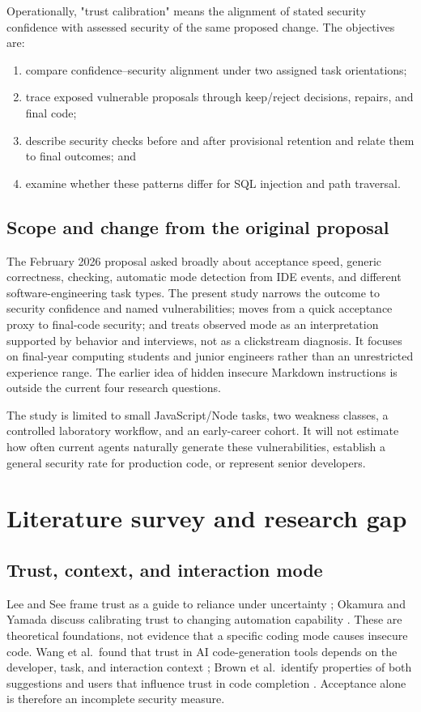 \documentclass[12pt,a4paper]{article}
\begin{document}
Operationally, "trust calibration" means the alignment of stated security confidence with assessed security of the same proposed change. The objectives are:
\begin{enumerate}
  \item compare confidence--security alignment under two assigned task orientations;
  \item trace exposed vulnerable proposals through keep/reject decisions, repairs, and final code;
  \item describe security checks before and after provisional retention and relate them to final outcomes; and
  \item examine whether these patterns differ for SQL injection and path traversal.
\end{enumerate}

\subsection{Scope and change from the original proposal}
The February 2026 proposal asked broadly about acceptance speed, generic correctness, checking, automatic mode detection from IDE events, and different software-engineering task types. The present study narrows the outcome to security confidence and named vulnerabilities; moves from a quick acceptance proxy to final-code security; and treats observed mode as an interpretation supported by behavior and interviews, not as a clickstream diagnosis. It focuses on final-year computing students and junior engineers rather than an unrestricted experience range. The earlier idea of hidden insecure Markdown instructions is outside the current four research questions.

The study is limited to small JavaScript/Node tasks, two weakness classes, a controlled laboratory workflow, and an early-career cohort. It will not estimate how often current agents naturally generate these vulnerabilities, establish a general security rate for production code, or represent senior developers.

\section{Literature survey and research gap}

\subsection{Trust, context, and interaction mode}
Lee and See frame trust as a guide to reliance under uncertainty \cite{lee2004}; Okamura and Yamada discuss calibrating trust to changing automation capability \cite{okamura2020}. These are theoretical foundations, not evidence that a specific coding mode causes insecure code. Wang et al.\ found that trust in AI code-generation tools depends on the developer, task, and interaction context \cite{wang2024}; Brown et al.\ identify properties of both suggestions and users that influence trust in code completion \cite{brown2024}. Acceptance alone is therefore an incomplete security measure.
\end{document}
